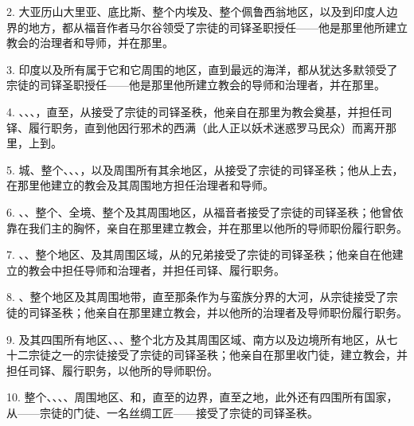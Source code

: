 2. 大亚历山大里亚、底比斯、整个内埃及、整个佩鲁西翁地区，以及到印度人边界的地方，都从福音作者马尔谷领受了宗徒的司铎圣职授任——他是那里他所建立教会的治理者和导师，并在那里。\par

3. 印度以及所有属于它和它周围的地区，直到最远的海洋，都从犹达多默领受了宗徒的司铎圣职授任——他是那里他所建立教会的导师和治理者，并在那里。\par

4. 、、、，直至，从接受了宗徒的司铎圣秩，他亲自在那里为教会奠基，并担任司铎、履行职务，直到他因行邪术的西满（此人正以妖术迷惑罗马民众）而离开那里，上到。\par

5. 城、整个、、、，以及周围所有其余地区，从接受了宗徒的司铎圣秩；他从上去，在那里他建立的教会及其周围地方担任治理者和导师。\par

6. 、、整个、全境、整个及其周围地区，从福音者接受了宗徒的司铎圣秩；他曾依靠在我们主的胸怀，亲自在那里建立教会，并在那里以他所的导师职份履行职务。\par

7. 、、整个地区、及其周围区域，从的兄弟接受了宗徒的司铎圣秩；他亲自在他建立的教会中担任导师和治理者，并担任司铎、履行职务。\par

8. 、整个地区及其周围地带，直至那条作为与蛮族分界的大河，从宗徒接受了宗徒的司铎圣秩；他亲自在那里建立教会，并以他所的治理者及导师职份履行职务。\par

9. 及其四围所有地区、、、整个北方及其周围区域、南方以及边境所有地区，从七十二宗徒之一的宗徒接受了宗徒的司铎圣秩；他亲自在那里收门徒，建立教会，并担任司铎、履行职务，以他所的导师职份。\par

10. 整个、、、、周围地区、和，直至的边界，直至之地，此外还有四围所有国家，从——宗徒的门徒、一名丝绸工匠——接受了宗徒的司铎圣秩。\par

